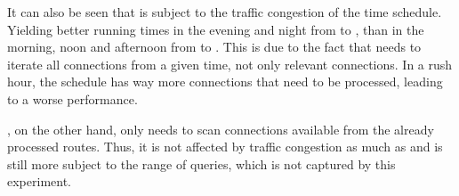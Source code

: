 	 It can also be seen that \csa is subject to the traffic congestion of the time schedule. Yielding better running times in the evening and night
	 from  to , than in the morning, noon and afternoon from  to .
	 This is due to the fact that \csa needs to iterate all connections from a given time, not only relevant connections. In a rush hour, the schedule
	 has way more connections that need to be processed, leading to a worse performance.
	 
	 \dijkstra, on the other hand, only needs to scan connections available from the already processed routes. Thus, it is not affected by traffic
	 congestion as much as \csa and is still more subject to the range of queries, which is not captured by this experiment.

